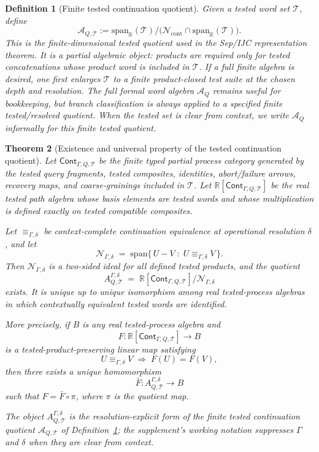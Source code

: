 \documentclass[11pt]{article}
\newtheorem{theorem}{Theorem}[section]
\newtheorem{definition}[theorem]{Definition}
\newcommand{\Cont}{\mathsf{Cont}}
\newcommand{\R}{\mathbb R}
\newcommand{\AQtest}{\mathcal A_{Q,\mathcal T}}
\begin{document}
\begin{definition}[Finite tested continuation quotient]\label{def:finite-tested-continuation-algebra}
Given a tested word set $\mathcal T$, define
\[
 \AQtest := \mathrm{span}_{\R}(\mathcal T)/\bigl(\mathcal N_{\mathrm{cont}}\cap \mathrm{span}_{\R}(\mathcal T)\bigr).
\]
This is the finite-dimensional tested quotient used in the Sep/IJC representation theorem.  It is a partial algebraic object: products are required only for tested concatenations whose product word is included in $\mathcal T$.  If a full finite algebra is desired, one first enlarges $\mathcal T$ to a finite product-closed test suite at the chosen depth and resolution.  The full formal word algebra $\mathcal A_Q$ remains useful for bookkeeping, but branch classification is always applied to a specified finite tested/resolved quotient.  When the tested set is clear from context, we write $\mathcal A_Q$ informally for this finite tested quotient.
\end{definition}

\begin{theorem}[Existence and universal property of the tested continuation quotient]\label{thm:universal-property-tested-quotient}
Let $\Cont_{\Gamma,Q,\mathcal T}$ be the finite typed partial process
category generated by the tested query fragments, tested composites,
identities, abort/failure arrows, recovery maps, and coarse-grainings
included in $\mathcal T$.  Let
$\R[\Cont_{\Gamma,Q,\mathcal T}]$ be the real tested path algebra whose
basis elements are tested words and whose multiplication is defined
exactly on tested compatible composites.

Let $\equiv_{\Gamma,\delta}$ be context-complete continuation
equivalence at operational resolution $\delta$, and let
\[
    \mathcal N_{\Gamma,\delta}
    \;=\;
    \mathrm{span}\{\,U-V \;:\; U\equiv_{\Gamma,\delta}V\,\}.
\]
Then $\mathcal N_{\Gamma,\delta}$ is a two-sided ideal for all defined
tested products, and the quotient
\[
    A^{\Gamma,\delta}_{Q,\mathcal T}
    \;=\;
    \R[\Cont_{\Gamma,Q,\mathcal T}]
    \big/\mathcal N_{\Gamma,\delta}
\]
exists.  It is unique up to unique isomorphism among real tested-process
algebras in which contextually equivalent tested words are identified.

More precisely, if $B$ is any real tested-process algebra and
\[
    F:\R[\Cont_{\Gamma,Q,\mathcal T}]\to B
\]
is a tested-product-preserving linear map satisfying
\[
    U\equiv_{\Gamma,\delta}V \;\Longrightarrow\; F(U)=F(V),
\]
then there exists a unique homomorphism
\[
    \bar F:A^{\Gamma,\delta}_{Q,\mathcal T}\to B
\]
such that $F=\bar F\circ\pi$, where $\pi$ is the quotient map.

The object $A^{\Gamma,\delta}_{Q,\mathcal T}$ is the resolution-explicit
form of the finite tested continuation quotient $\AQtest$ of
Definition~\ref{def:finite-tested-continuation-algebra}; the supplement's
working notation suppresses $\Gamma$ and $\delta$ when they are clear
from context.
\end{theorem}
\end{document}
